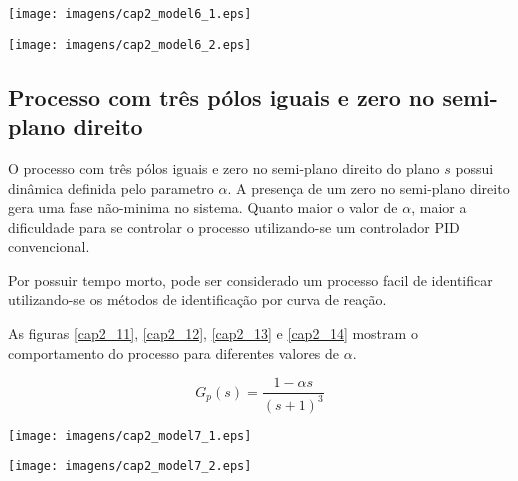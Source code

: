     \begin{center}
        \texttt{[image: imagens/cap2\_model6\_1.eps]}
        \label{cap2_9}
    \end{center}
    
    \begin{center}
        \texttt{[image: imagens/cap2\_model6\_2.eps]}
        \label{cap2_10}
    \end{center}

\subsection{Processo com três pólos iguais e zero no semi-plano direito}

    O processo com três pólos iguais e zero no semi-plano direito do plano $s$
    possui dinâmica definida pelo parametro $\alpha$. A presença de um
    zero no semi-plano direito gera uma fase não-minima no sistema. Quanto maior
    o valor de $\alpha$, maior a dificuldade para se controlar o processo
    utilizando-se um controlador \acs{PID} convencional.
    
    Por possuir tempo morto, pode ser considerado um processo facil de identificar
    utilizando-se os métodos de identificação por curva de reação.
    
    As figuras \ref{cap2_11}, \ref{cap2_12}, \ref{cap2_13} e \ref{cap2_14}
    mostram o comportamento do processo para diferentes valores de $\alpha$.

    \begin{equation}
        G_p(s) = \frac{1-\alpha s}{(s+1)^3}
    \end{equation}

    \begin{center}
        \texttt{[image: imagens/cap2\_model7\_1.eps]}
        \label{cap2_11}
    \end{center}

    \begin{center}
        \texttt{[image: imagens/cap2\_model7\_2.eps]}
        \label{cap2_12}
    \end{center}
    
